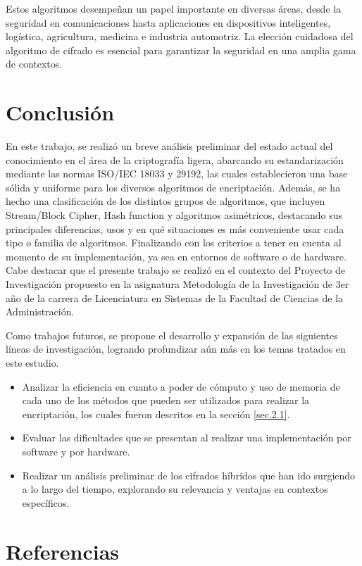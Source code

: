 \documentclass[a4paper,10pt]{article}
\begin{document}
	Estos algoritmos desempeñan un papel importante en diversas áreas, desde la seguridad en comunicaciones hasta aplicaciones en dispositivos inteligentes, logística, agricultura, medicina e industria automotriz. La elección cuidadosa del algoritmo de cifrado es esencial para garantizar la seguridad en una amplia gama de contextos.
	
	\section{Conclusión}
	En este trabajo, se realizó un breve análisis preliminar del estado actual del conocimiento en el área de la criptografía ligera, abarcando su estandarización mediante las normas ISO/IEC 18033 y 29192, las cuales establecieron una base sólida y uniforme para los diversos algoritmos de encriptación. Además, se ha hecho una clasificación de los distintos grupos de algoritmos, que incluyen Stream/Block Cipher, Hash function y algoritmos asimétricos, destacando sus principales diferencias, usos y en qué situaciones es más conveniente usar cada tipo o familia de algoritmos. Finalizando con los criterios a tener en cuenta al momento de su implementación, ya sea en entornos de software o de hardware. Cabe destacar que el presente trabajo se realizó en el contexto del Proyecto de Investigación propuesto en la asignatura Metodología de la Investigación de 3er año de la carrera de Licenciatura en Sistemas de la Facultad de Ciencias de la Administración.
	
	Como trabajos futuros, se propone el desarrollo y expansión de las siguientes líneas de investigación, logrando profundizar aún más en los temas tratados en este estudio.

	\begin{itemize}
	\item Analizar la eficiencia en cuanto a poder de cómputo y uso de memoria de cada uno de los métodos que pueden ser utilizados para realizar la encriptación, los cuales fueron descritos en la sección \ref{sec.2.1}.
	\item Evaluar las dificultades que se presentan al realizar una implementación por software y por hardware.
	\item Realizar un análisis preliminar de los cifrados híbridos que han ido surgiendo a lo largo del tiempo, explorando su relevancia y ventajas en contextos específicos.
	\end{itemize}
	
	\section{Referencias}
	\nocite{*}
	\printbibliography[heading=none]
\end{document}
